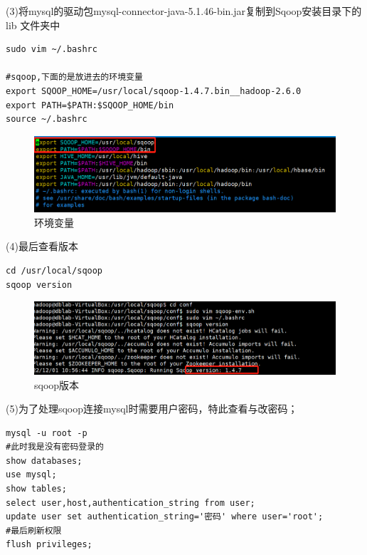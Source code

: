 \documentclass[12pt]{article}
\begin{document}
(3)将mysql的驱动包mysql-connector-java-5.1.46-bin.jar复制到Sqoop安装目录下的lib 文件夹中

\begin{lstlisting}[language={[ANSI]C}]
sudo vim ~/.bashrc

#sqoop,下面的是放进去的环境变量
export SQOOP_HOME=/usr/local/sqoop-1.4.7.bin__hadoop-2.6.0
export PATH=$PATH:$SQOOP_HOME/bin
source ~/.bashrc
\end{lstlisting}

\begin{figure}[ht]
\centering
\includegraphics[scale=0.9]{figures/23.png}
\caption{环境变量}\label{fig:label2}
\end{figure}

\newpage
(4)最后查看版本

\begin{lstlisting}[language={[ANSI]C}]
cd /usr/local/sqoop
sqoop version
\end{lstlisting}


\begin{figure}[ht]
\centering
\includegraphics[scale=0.8]{figures/24.png}
\caption{sqoop版本}\label{fig:label2}
\end{figure}

(5)为了处理sqoop连接mysql时需要用户密码，特此查看与改密码；

\begin{lstlisting}[language={[ANSI]C}]
mysql -u root -p
#此时我是没有密码登录的
show databases;
use mysql;
show tables;
select user,host,authentication_string from user;
update user set authentication_string='密码' where user='root';
#最后刷新权限
flush privileges;
\end{lstlisting}
\end{document}
